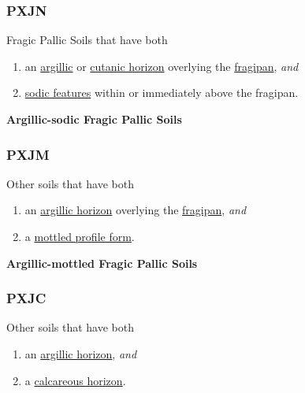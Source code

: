 \documentclass[
  letterpaper,
  DIV=11,
  numbers=noendperiod]{scrreprt}
\providecommand{\tightlist}{%
  \setlength{\itemsep}{0pt}\setlength{\parskip}{0pt}}\usepackage{longtable,booktabs,array}
\begin{document}
\hypertarget{sec-key-PXJN}{%
\subsubsection{\texorpdfstring{\textbf{PXJN}}{PXJN}}\label{sec-key-PXJN}}

Fragic Pallic Soils that have both

\begin{enumerate}
\def\labelenumi{\arabic{enumi}.}
\tightlist
\item
  an \protect\hyperlink{sec-diag-argh}{argillic} or
  \protect\hyperlink{sec-diag-cuth}{cutanic horizon} overlying the
  \protect\hyperlink{sec-diag-fpan}{fragipan}, \emph{and}
\item
  \protect\hyperlink{sec-diag-sod}{sodic features} within or immediately
  above the fragipan.
\end{enumerate}

\textbf{Argillic-sodic Fragic Pallic Soils}

\hypertarget{sec-key-PXJM}{%
\subsubsection{\texorpdfstring{\textbf{PXJM}}{PXJM}}\label{sec-key-PXJM}}

Other soils that have both

\begin{enumerate}
\def\labelenumi{\arabic{enumi}.}
\tightlist
\item
  an \protect\hyperlink{sec-diag-argh}{argillic horizon} overlying the
  \protect\hyperlink{sec-diag-fpan}{fragipan}, \emph{and}
\item
  a \protect\hyperlink{sec-diag-mottpf}{mottled profile form}.
\end{enumerate}

\textbf{Argillic-mottled Fragic Pallic Soils}

\hypertarget{sec-key-PXJC}{%
\subsubsection{\texorpdfstring{\textbf{PXJC}}{PXJC}}\label{sec-key-PXJC}}

Other soils that have both

\begin{enumerate}
\def\labelenumi{\arabic{enumi}.}
\tightlist
\item
  an \protect\hyperlink{sec-diag-argh}{argillic horizon}, \emph{and}
\item
  a \protect\hyperlink{sec-diag-calch}{calcareous horizon}.
\end{enumerate}
\end{document}
